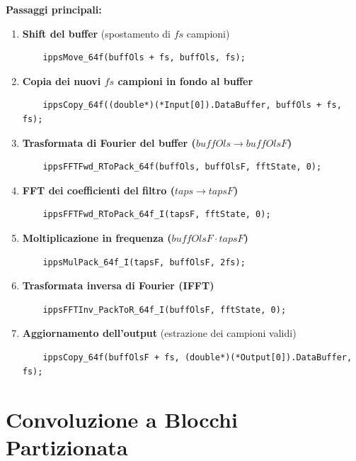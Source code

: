 \textbf{Passaggi principali:}

\begin{enumerate}
    \item \textbf{Shift del buffer} (spostamento di $fs$ campioni)
    \begin{verbatim}
    ippsMove_64f(buffOls + fs, buffOls, fs);
    \end{verbatim}
    
    \item \textbf{Copia dei nuovi $fs$ campioni in fondo al buffer}
    \begin{verbatim}
    ippsCopy_64f((double*)(*Input[0]).DataBuffer, buffOls + fs, fs);
    \end{verbatim}
    
    \item \textbf{Trasformata di Fourier del buffer ($buffOls \to buffOlsF$)}
    \begin{verbatim}
    ippsFFTFwd_RToPack_64f(buffOls, buffOlsF, fftState, 0);
    \end{verbatim}
    
    \item \textbf{FFT dei coefficienti del filtro ($taps \to tapsF$)}
    \begin{verbatim}
    ippsFFTFwd_RToPack_64f_I(tapsF, fftState, 0);
    \end{verbatim}
    
    \item \textbf{Moltiplicazione in frequenza ($buffOlsF \cdot tapsF$)}
    \begin{verbatim}
    ippsMulPack_64f_I(tapsF, buffOlsF, 2fs);
    \end{verbatim}
    
    \item \textbf{Trasformata inversa di Fourier (IFFT)}
    \begin{verbatim}
    ippsFFTInv_PackToR_64f_I(buffOlsF, fftState, 0);
    \end{verbatim}
    
    \item \textbf{Aggiornamento dell'output} (estrazione dei campioni validi)
    \begin{verbatim}
    ippsCopy_64f(buffOlsF + fs, (double*)(*Output[0]).DataBuffer, fs);
    \end{verbatim}
\end{enumerate}

\vspace{3cm}

\section{Convoluzione a Blocchi Partizionata}

